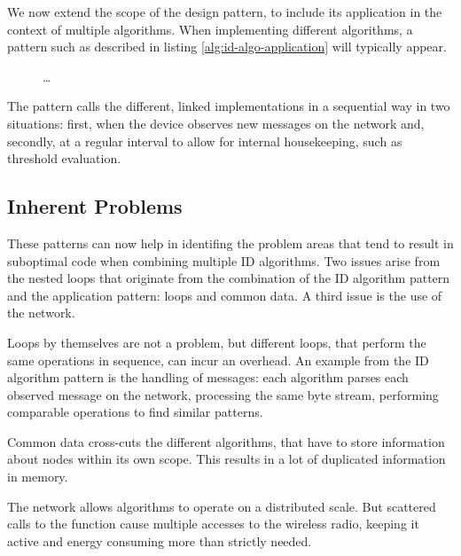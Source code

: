 \documentclass[conference]{IEEEtran}
\begin{document}
We now extend the scope of the design pattern, to include its application in
the context of multiple algorithms. When implementing different algorithms, a
pattern such as described in listing \ref{alg:id-algo-application} will
typically appear.

\begin{figure}[ht]
\begin{algorithmic}[1]
   
    \State {}
  \EndFor
  \State \dots
    \State {}
  \EndFor
\end{algorithmic}
\end{figure}

The pattern calls the different, linked implementations in a sequential way in
two situations: first, when the device observes new messages on the network
and, secondly, at a regular interval to allow for internal housekeeping, such
as threshold evaluation.

\subsection{Inherent Problems}
\label{pattern-problems}

These patterns can now help in identifing the problem areas that tend to result
in suboptimal code when combining multiple ID algorithms. Two issues arise from
the nested loops that originate from the combination of the ID algorithm
pattern and the application pattern: loops and common data. A third issue is
the use of the network.

\begin{LaTeXdescription}

  \item[Loops] by themselves are not a problem, but different loops, that
  perform the same operations in sequence, can incur an overhead. An example
  from the ID algorithm pattern is the handling of messages: each algorithm
  parses each observed message on the network, processing the same byte stream,
  performing comparable operations to find similar patterns.

  \item[Common data] cross-cuts the different algorithms, that have to store
  information about nodes within its own scope. This results in a lot of
  duplicated information in memory.

  \item[The network] allows algorithms to operate on a distributed scale. But
  scattered calls to the  function cause multiple accesses to the
  wireless radio, keeping it active and energy consuming more than strictly
  needed.

\end{LaTeXdescription}
\end{document}
